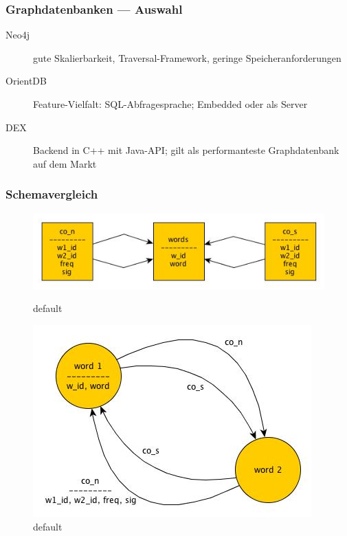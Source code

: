 \documentclass{beamer}
\begin{document}
\begin{frame}\frametitle{Graphdatenbanken --- Auswahl}
	\begin{description}
		\item[Neo4j] gute Skalierbarkeit, Traversal-Framework, geringe Speicheranforderungen
		\item[OrientDB] Feature-Vielfalt: SQL-Abfragesprache; Embedded oder als Server
		\item[DEX] Backend in C++ mit Java-API; gilt als performanteste Graphdatenbank auf dem Markt
	\end{description}
\end{frame}

\begin{frame}\frametitle{Schemavergleich}
\begin{figure}[ht]
\begin{minipage}[b]{0.45\linewidth}
\centering
\includegraphics[scale=0.3]{images/mysql_schema}
\caption{default}
\label{fig:mysql_schema}
\end{minipage}
\hspace{0.5cm}
\begin{minipage}[b]{0.45\linewidth}
\centering
\includegraphics[scale=0.3]{images/graph_schema}
\caption{default}
\label{fig:graph_schema}
\end{minipage}
\end{figure}
\end{frame}
\end{document}
